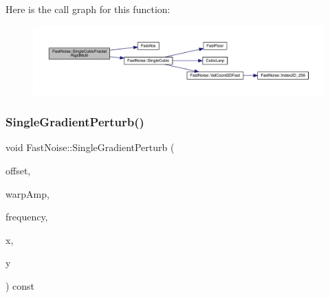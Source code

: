 Here is the call graph for this function\+:
\nopagebreak
\begin{figure}[H]
\begin{center}
\leavevmode
\includegraphics[width=350pt]{d1/dd8/class_fast_noise_ab460847f52a3b64ac6ebbda5538c9c9a_cgraph}
\end{center}
\end{figure}
\mbox{\label{class_fast_noise_a10f8238bf167c02937ad19c0f081549a}} 
\subsubsection{\texorpdfstring{Single\+Gradient\+Perturb()}{SingleGradientPerturb()}\hspace{0.1cm}{\footnotesize\ttfamily [1/2]}}
{\footnotesize\ttfamily void Fast\+Noise\+::\+Single\+Gradient\+Perturb (\begin{DoxyParamCaption}\item[{unsigned char}]{offset,  }\item[{\mbox{\hyperlink{_fast_noise_8h_a75a9ef6d2541c4921815b885bfd449c3}{F\+N\+\_\+\+D\+E\+C\+I\+M\+AL}}}]{warp\+Amp,  }\item[{\mbox{\hyperlink{_fast_noise_8h_a75a9ef6d2541c4921815b885bfd449c3}{F\+N\+\_\+\+D\+E\+C\+I\+M\+AL}}}]{frequency,  }\item[{\mbox{\hyperlink{_fast_noise_8h_a75a9ef6d2541c4921815b885bfd449c3}{F\+N\+\_\+\+D\+E\+C\+I\+M\+AL}} \&}]{x,  }\item[{\mbox{\hyperlink{_fast_noise_8h_a75a9ef6d2541c4921815b885bfd449c3}{F\+N\+\_\+\+D\+E\+C\+I\+M\+AL}} \&}]{y }\end{DoxyParamCaption}) const\hspace{0.3cm}{\ttfamily [private]}}

